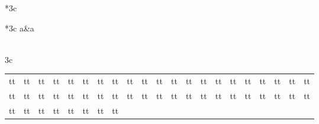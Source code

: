 \begin{longtable}{*3c}
\begin{array}{*3c}
\ddot a&\tilde a\\
\end{array}\) \\
\multicolumn 3c{
\begin{tabular}{*{21}c}
{\color{AntiqueWhite1} t}\textcolor{AntiqueWhite1} t &
{\color{AntiqueWhite2} t}\textcolor{AntiqueWhite2} t &
{\color{AntiqueWhite3} t}\textcolor{AntiqueWhite3} t &
{\color{AntiqueWhite4} t}\textcolor{AntiqueWhite4} t &
{\color{Aquamarine1} t}\textcolor{Aquamarine1} t &
{\color{Aquamarine2} t}\textcolor{Aquamarine2} t &
{\color{Aquamarine3} t}\textcolor{Aquamarine3} t &
{\color{Aquamarine4} t}\textcolor{Aquamarine4} t &
{\color{Azure1} t}\textcolor{Azure1} t &
{\color{Azure2} t}\textcolor{Azure2} t &
{\color{Azure3} t}\textcolor{Azure3} t &
{\color{Azure4} t}\textcolor{Azure4} t &
{\color{Bisque1} t}\textcolor{Bisque1} t &
{\color{Bisque2} t}\textcolor{Bisque2} t &
{\color{Bisque3} t}\textcolor{Bisque3} t &
{\color{Bisque4} t}\textcolor{Bisque4} t &
{\color{Blue1} t}\textcolor{Blue1} t &
{\color{Blue2} t}\textcolor{Blue2} t &
{\color{Blue3} t}\textcolor{Blue3} t &
{\color{Blue4} t}\textcolor{Blue4} t &
{\color{Brown1} t}\textcolor{Brown1} t \\
{\color{Brown2} t}\textcolor{Brown2} t &
{\color{Brown3} t}\textcolor{Brown3} t &
{\color{Brown4} t}\textcolor{Brown4} t &
{\color{Burlywood1} t}\textcolor{Burlywood1} t &
{\color{Burlywood2} t}\textcolor{Burlywood2} t &
{\color{Burlywood3} t}\textcolor{Burlywood3} t &
{\color{Burlywood4} t}\textcolor{Burlywood4} t &
{\color{CadetBlue1} t}\textcolor{CadetBlue1} t &
{\color{CadetBlue2} t}\textcolor{CadetBlue2} t &
{\color{CadetBlue3} t}\textcolor{CadetBlue3} t &
{\color{CadetBlue4} t}\textcolor{CadetBlue4} t &
{\color{Chartreuse1} t}\textcolor{Chartreuse1} t &
{\color{Chartreuse2} t}\textcolor{Chartreuse2} t &
{\color{Chartreuse3} t}\textcolor{Chartreuse3} t &
{\color{Chartreuse4} t}\textcolor{Chartreuse4} t &
{\color{Chocolate1} t}\textcolor{Chocolate1} t &
{\color{Chocolate2} t}\textcolor{Chocolate2} t &
{\color{Chocolate3} t}\textcolor{Chocolate3} t &
{\color{Chocolate4} t}\textcolor{Chocolate4} t &
{\color{Coral1} t}\textcolor{Coral1} t &
{\color{Coral2} t}\textcolor{Coral2} t \\
{\color{Coral3} t}\textcolor{Coral3} t &
{\color{Coral4} t}\textcolor{Coral4} t &
{\color{Cornsilk1} t}\textcolor{Cornsilk1} t &
{\color{Cornsilk2} t}\textcolor{Cornsilk2} t &
{\color{Cornsilk3} t}\textcolor{Cornsilk3} t &
{\color{Cornsilk4} t}\textcolor{Cornsilk4} t &
{\color{Cyan1} t}\textcolor{Cyan1} t &
{\color{Cyan2} t}\textcolor{Cyan2} t &

\end{tabular}}
\end{longtable}
